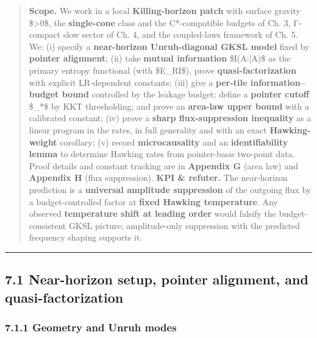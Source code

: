 \documentclass[
]{article}
\numberwithin{equation}{section}
\begin{document}
\begin{quote}
\textbf{Scope.} We work in a local \textbf{Killing-horizon patch} with
surface gravity \$\kappa\textgreater0\$, the \textbf{single-cone} class
and the C*-compatible budgets of Ch. 3, Γ-compact slow sector of Ch. 4,
and the coupled-laws framework of Ch. 5. We: (i) specify a
\textbf{near-horizon Unruh-diagonal GKSL model} fixed by \textbf{pointer
alignment}; (ii) take \textbf{mutual information} \$I(A:\bar A)\$ as the
primary entropy functional (with \$E\_R\le I\$), prove
\textbf{quasi-factorization} with explicit LR-dependent constants; (iii)
give a \textbf{per-tile information--budget bound} controlled by the
leakage budget; define a \textbf{pointer cutoff} \$\ell\_*\$ by KKT
thresholding; and prove an \textbf{area-law upper bound} with a
calibrated constant; (iv) prove a \textbf{sharp flux-suppression
inequality} as a linear program in the rates, in full generality and
with an exact \textbf{Hawking-weight} corollary; (v) record
\textbf{microcausality} and an \textbf{identifiability lemma} to
determine Hawking rates from pointer-basis two-point data. Proof details
and constant tracking are in \textbf{Appendix G} (area law) and
\textbf{Appendix H} (flux suppression). \textbf{KPI \& refuter.} The
near-horizon prediction is a \textbf{universal amplitude suppression} of
the outgoing flux by a budget-controlled factor at \textbf{fixed Hawking
temperature}. Any observed \textbf{temperature shift at leading order}
would falsify the budget-consistent GKSL picture; amplitude-only
suppression with the predicted frequency shaping supports it.
\end{quote}

\begin{center}\rule{0.5\linewidth}{0.5pt}\end{center}

\hypertarget{near-horizon-setup-pointer-alignment-and-quasi-factorization}{%
\subsection{7.1 Near-horizon setup, pointer alignment, and
quasi-factorization}\label{near-horizon-setup-pointer-alignment-and-quasi-factorization}}

\hypertarget{geometry-and-unruh-modes}{%
\subsubsection{7.1.1 Geometry and Unruh
modes}\label{geometry-and-unruh-modes}}
\end{document}
